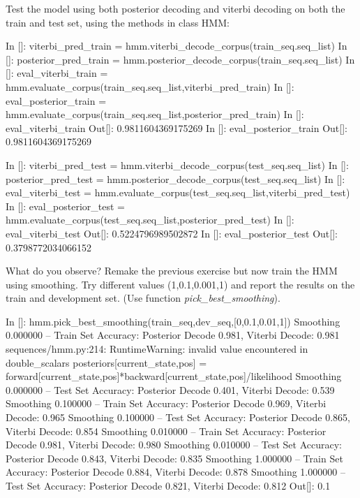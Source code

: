 \begin{exercise}
Test the model using both posterior decoding and viterbi decoding on
both the train and test set, using the methods in class HMM:
\begin{python}
In []: viterbi_pred_train = hmm.viterbi_decode_corpus(train_seq.seq_list)
In []: posterior_pred_train = hmm.posterior_decode_corpus(train_seq.seq_list)
In []: eval_viterbi_train =   hmm.evaluate_corpus(train_seq.seq_list,viterbi_pred_train)
In []: eval_posterior_train = hmm.evaluate_corpus(train_seq.seq_list,posterior_pred_train)
In []: eval_viterbi_train
Out[]: 0.9811604369175269
In []: eval_posterior_train
Out[]: 0.9811604369175269

In []: viterbi_pred_test = hmm.viterbi_decode_corpus(test_seq.seq_list)
In []: posterior_pred_test = hmm.posterior_decode_corpus(test_seq.seq_list)
In []: eval_viterbi_test =   hmm.evaluate_corpus(test_seq.seq_list,viterbi_pred_test)
In []: eval_posterior_test = hmm.evaluate_corpus(test_seq.seq_list,posterior_pred_test)
In []: eval_viterbi_test
Out[]: 0.5224796989502872
In []: eval_posterior_test
Out[]: 0.3798772034066152


\end{python}

What do you observe? Remake the previous exercise but now train the HMM
using smoothing. Try different values (1,0.1,0.001,1) and report the results on the
train and development set. (Use function
\emph{pick\_best\_smoothing}).


\begin{python}
In []: hmm.pick_best_smoothing(train_seq,dev_seq,[0,0.1,0.01,1])
Smoothing 0.000000 --  Train Set Accuracy: Posterior Decode 0.981, Viterbi Decode: 0.981
sequences/hmm.py:214: RuntimeWarning: invalid value encountered in double_scalars
  posteriors[current_state,pos] = forward[current_state,pos]*backward[current_state,pos]/likelihood
Smoothing 0.000000 -- Test Set Accuracy: Posterior Decode 0.401, Viterbi Decode: 0.539
Smoothing 0.100000 --  Train Set Accuracy: Posterior Decode 0.969, Viterbi Decode: 0.965
Smoothing 0.100000 -- Test Set Accuracy: Posterior Decode 0.865, Viterbi Decode: 0.854
Smoothing 0.010000 --  Train Set Accuracy: Posterior Decode 0.981, Viterbi Decode: 0.980
Smoothing 0.010000 -- Test Set Accuracy: Posterior Decode 0.843, Viterbi Decode: 0.835
Smoothing 1.000000 --  Train Set Accuracy: Posterior Decode 0.884, Viterbi Decode: 0.878
Smoothing 1.000000 -- Test Set Accuracy: Posterior Decode 0.821, Viterbi Decode: 0.812
Out[]: 0.1
\end{python}


\end{exercise}
